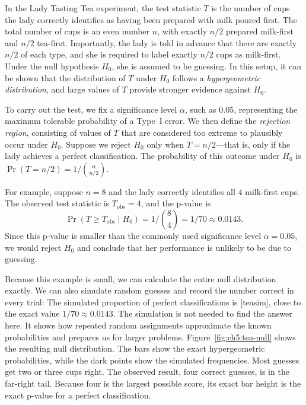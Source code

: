 \begin{example}

In the Lady Tasting Tea experiment, the test statistic $T$ is the 
number of cups the lady correctly identifies as having been prepared 
with milk poured first. The total number of cups is an even number $n$, 
with exactly $n/2$ prepared milk-first and $n/2$ tea-first. Importantly, 
the lady is told in advance that there are exactly $n/2$ of each type, 
and she is required to label exactly $n/2$ cups as milk-first. Under the 
null hypothesis $H_0$, she is assumed to be guessing. In this setup, 
it can be shown that the distribution of $T$ under $H_0$ follows a 
\emph{hypergeometric distribution}, 
and large values of $T$ provide stronger evidence against $H_0$.

To carry out the test, we fix a significance level $\alpha$, such as
$0.05$, representing the maximum tolerable probability of a Type~I
error. We then define the \emph{rejection region}, consisting of
values of $T$ that are considered too extreme to plausibly occur under
$H_0$. Suppose we reject $H_0$ only when $T = n/2$—that is, only if
the lady achieves a perfect classification. The probability of this
outcome under $H_0$ is $\Pr(T = n/2) = 1 / \binom{n}{n/2}$.


For example, suppose $n = 8$ and the lady correctly identifies all 
$4$ milk-first cups. The observed test statistic is 
$T_{\text{obs}} = 4$, and the p-value is 
\[
  \Pr(T \ge T_{\text{obs}} \mid H_0) = 1 / \binom{8}{4}
  = 1/70 \approx  0.0143.
\]
Since this p-value is smaller than the commonly used significance
level $\alpha = 0.05$, we would reject $H_0$ and conclude that her
performance is unlikely to be due to guessing.

Because this example is small, we can calculate the entire null
distribution exactly. We can also simulate random guesses and record
the number correct in every trial:
The simulated proportion of perfect classifications is
[teasim], close to the exact value
$1/70 \approx 0.0143$. The simulation is not needed to find the
answer here. It shows how repeated random assignments approximate the
known probabilities and prepares us for larger problems.
Figure~\ref{fig:ch5:tea-null} shows the resulting null distribution.
The bars show the exact hypergeometric probabilities, while the dark
points show the simulated frequencies. Most guesses get two or three
cups right. The observed result, four correct guesses, is in the
far-right tail. Because four is the largest possible score, its exact
bar height is the exact p-value for a perfect classification.


\end{example}
